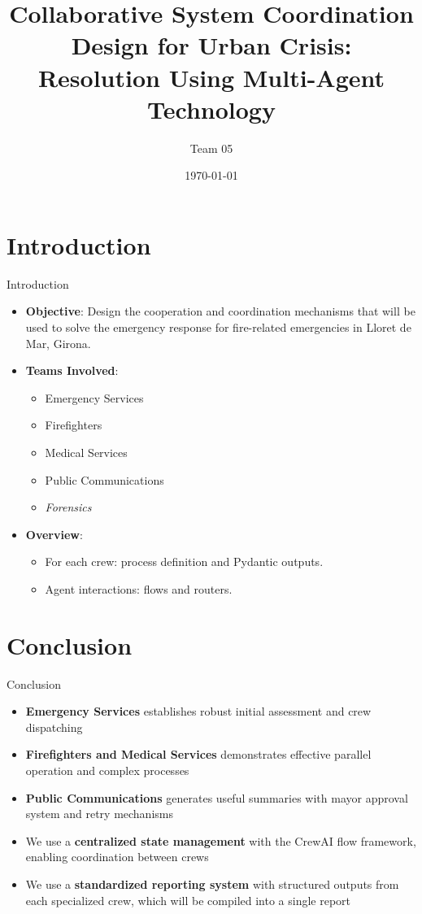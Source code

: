 \documentclass{beamer}
\title{Collaborative System Coordination Design for Urban Crisis: Resolution Using Multi-Agent Technology}
\author{Team 05}
\date{\today}
\begin{document}
\begin{frame}
    \titlepage
\end{frame}

\section{Introduction}
\begin{frame}{Introduction}
    \begin{itemize}
        \item \textbf{Objective}: Design the cooperation and coordination mechanisms that will
        be used to solve the emergency response for fire-related emergencies in Lloret de Mar, Girona.
        \item \textbf{Teams Involved}:
            \begin{itemize}
                \item Emergency Services
                \item Firefighters
                \item Medical Services
                \item Public Communications
                \item \textit{Forensics}
            \end{itemize}
        \item \textbf{Overview}:
            \begin{itemize}
                \item For each crew: process definition and Pydantic outputs. 
                \item Agent interactions: flows and routers.
            \end{itemize}
    \end{itemize}
\end{frame}







\section{Conclusion}
\begin{frame}{Conclusion}
    \begin{itemize}
        \item \textbf{Emergency Services} establishes robust initial assessment and crew dispatching
        \item \textbf{Firefighters and Medical Services} demonstrates effective parallel operation and complex processes
        \item \textbf{Public Communications} generates useful summaries with mayor approval system and retry mechanisms
        \item We use a \textbf{centralized state management} with the CrewAI flow framework, enabling coordination between crews
        \item We use a \textbf{standardized reporting system} with structured outputs from each specialized crew, which will be compiled into a single report
    \end{itemize}
\end{frame}
\end{document}
